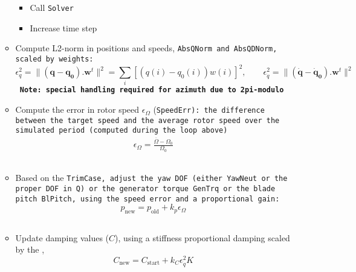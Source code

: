 \begin{itemize}
\begin{itemize}
                \begin{itemize} \tightlist
                    \item Call \tt{Solver}
                    \item Increase time step
                \end{itemize}
            \item Compute L2-norm in positions and speeds, \tt{AbsQNorm} and
                \tt{AbsQDNorm}, scaled by weights:
                \[\epsilon_q^2 = \rVert (\boldsymbol{q}-\boldsymbol{q_0}). \boldsymbol{w}^t\lVert^2 = \sum_i \left[(q(i)-q_0(i)) w(i) \right]^2
                    ,\qquad \epsilon_{\dot{q}}^2 = \rVert (\boldsymbol{\dot{q}}-\boldsymbol{\dot{q}_0}). \boldsymbol{w}^t\lVert^2
                \] \textbf{Note: special handling required for azimuth due to
                2pi-modulo}
            \item Compute the error in rotor speed \(\epsilon_\Omega\)
                (\tt{SpeedErr}): the difference between the target speed and the
                average rotor speed over the simulated period (computed during the
                loop above)
                \begin{align}
                    \epsilon_\Omega = \frac{\overline{\Omega} - \Omega_0}{\Omega_0}
                \end{align}
            \item Based on the \tt{TrimCase}, adjust the yaw DOF (either
                \tt{YawNeut} or the proper DOF in \tt{Q}) or the generator
                torque \tt{GenTrq} or the blade pitch \tt{BlPitch}, using
                the speed error and a proportional gain:
                \[ p_\text{new} = p_\text{old} + k_p \epsilon_\Omega\]
            \item Update damping values (\(C\)), using a stiffness proportional
                damping scaled by the ,
                \[ C_\text{new} = C_\text{start} + k_C \epsilon_{\dot{q}}^2 K\]
        \end{itemize}
\end{itemize}

